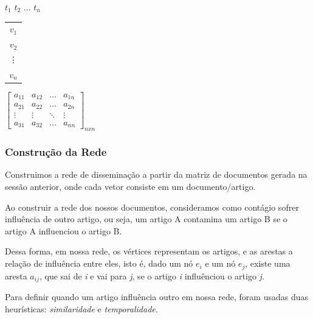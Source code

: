 \documentclass[a4paper,12pt]{article}
\begin{document}
 \begin{center}
 \hspace{0.2cm}$t_{1}$ \hspace{0.5cm} $t_{2}$ \hspace{0.3cm} $\hdots$ \hspace{0.4cm}$t_{n}$
 
 \vspace{0.2cm}
 
\begin{tabular}{c}
   $v_{1}$ \\
   $v_{2}$ \\
   \vdots\\
   $v_{n}$
 \end{tabular}
 $
 \begin{bmatrix}
  a_{11} & a_{12} & \hdots & a_{1n}\\
  a_{21} & a_{22} & \hdots & a_{2n}\\
  \vdots & \vdots & \ddots & \vdots\\
  a_{31} & a_{32} & \hdots & a_{nn}
 \end{bmatrix}_{nxn}
$

\end{center}



\subsubsection{Construção da Rede}

 Construimos a rede de disseminação a partir da matriz de documentos gerada na sessão anterior, onde cada vetor consiste em um documento/artigo.
 
 Ao construir a rede dos nossos documentos,
 consideramos como contágio sofrer influência de outro artigo, ou seja, um artigo A contamina um artigo B se o artigo A influenciou o
 artigo B.
 
 Dessa forma, em nossa rede, os vértices representam os artigos, e as arestas a relação de influência entre eles, isto é, dado um nó $e_{i}$ e um nó
 $e_{j}$, existe uma aresta $a_{ij}$, que sai de \textit{i} e vai para \textit{j}, se o artigo \textit{i} influênciou o artigo \textit{j}.
 
 Para definir quando um artigo influência outro em nossa rede, foram usadas duas heurísticas: \textit{similaridade} e 
 \textit{temporalidade}.
 
\end{document}
